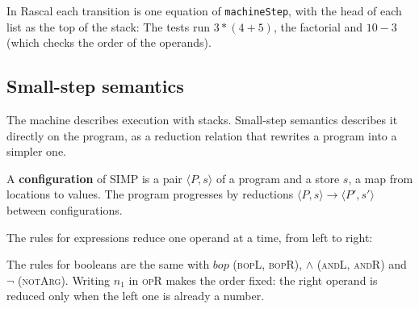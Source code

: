 In Rascal each transition is one equation of \texttt{machineStep}, with the
head of each list as the top of the stack:
The tests run $3 * (4 + 5)$, the factorial and $10 - 3$ (which checks the order
of the operands).

\subsection{Small-step semantics}

The machine describes execution with stacks. Small-step semantics describes
it directly on the program, as a reduction relation that rewrites a program
into a simpler one.

\begin{definition}
A \textbf{configuration} of SIMP is a pair $\langle P, s \rangle$ of a program and a
store $s$, a map from locations to values. The program progresses by
reductions $\langle P, s \rangle \to \langle P', s' \rangle$ between configurations.
\end{definition}

The rules for expressions reduce one operand at a time, from left to right:
The rules for booleans are the same with $\mathit{bop}$ (\textsc{bopL},
\textsc{bopR}), $\wedge$ (\textsc{andL}, \textsc{andR}) and $\neg$
(\textsc{notArg}). Writing $n_1$ in \textsc{opR} makes the order fixed: the
right operand is reduced only when the left one is already a number.

